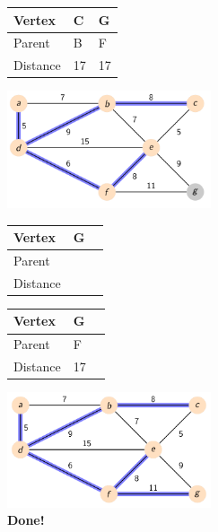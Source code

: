 \documentclass{beamer}
\begin{document}
\begin{frame}[fragile]
    \centering
    \begin{table}[]
        \begin{tabular}{|l|l|l|}
            \hline
            Vertex   & C  & G  \\ \hline
            Parent   & B  & F  \\ \hline
            Distance & 17 & 17 \\ \hline
        \end{tabular}
    \end{table}
    \includegraphics[width=0.45\textwidth]{./imgs/dijkstra_walkthrough/dijkstra-7.png}
    \begin{table}[]
        \begin{tabular}{|l|l|l|}
            \hline
            Vertex   &  G  \\ \hline
            Parent   &    \\ \hline
            Distance &   \\ \hline
        \end{tabular}
    \end{table}
\end{frame}

\begin{frame}[fragile]
    \centering

    \begin{table}[]
        \begin{tabular}{|l|l|l|}
            \hline
            Vertex   &  G  \\ \hline
            Parent   &  F  \\ \hline
            Distance &  17 \\ \hline
        \end{tabular}
    \end{table}

    \includegraphics[width=0.45\textwidth]{./imgs/dijkstra_walkthrough/dijkstra-8.png}
    \\
    \textbf{Done!}

\end{frame}
\end{document}
